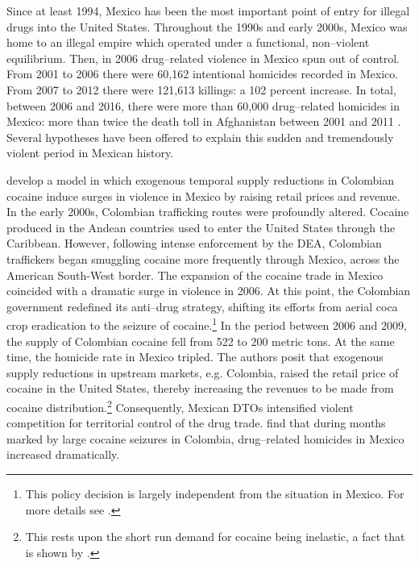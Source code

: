 \documentclass[12pt,letter,english,intoc,bibliography=totoc,index=totoc,BCOR10mm,captions=tableheading,nottitlepage,fleqn]{article}
\theoremstyle{break}
\begin{document}
Since at least 1994, Mexico has been the most important point of entry for illegal drugs into the United States. Throughout the 1990s and early 2000s, Mexico was home to an illegal empire which operated under a functional, non--violent equilibrium. Then, in 2006 drug--related violence in Mexico spun out of control. From 2001 to 2006 there were 60,162 intentional homicides recorded in Mexico. From 2007 to 2012 there were 121,613 killings: a 102 percent increase. In total, between 2006 and 2016, there were more than 60,000 drug--related homicides in Mexico: more than twice the death toll in Afghanistan between 2001 and 2011 \citep{Castillo2020}. Several hypotheses have been offered to explain this sudden and tremendously violent period in Mexican history. 

\citet{Castillo2020} develop a model in which exogenous temporal supply reductions in Colombian cocaine induce surges in violence in Mexico by raising retail prices and revenue. In the early 2000s, Colombian trafficking routes were profoundly altered. Cocaine produced in the Andean countries used to enter the United States through the Caribbean. However, following intense enforcement by the DEA, Colombian traffickers began smuggling cocaine more frequently through Mexico, across the American South-West border. The expansion of the cocaine trade in Mexico coincided with a dramatic surge in violence in 2006. At this point, the Colombian government redefined its anti--drug strategy, shifting its efforts from aerial coca crop eradication to the seizure of cocaine.\footnote{This policy decision is largely independent from the situation in Mexico. For more details see \citet{Castillo2020}.} In the period between 2006 and 2009, the supply of Colombian cocaine fell from 522 to 200 metric tons. At the same time, the homicide rate in Mexico tripled. The authors posit that exogenous supply reductions in upstream markets, e.g. Colombia, raised the retail price of cocaine in the United States, thereby increasing the revenues to be made from cocaine distribution.\footnote{This rests upon the short run demand for cocaine being inelastic, a fact that is shown by \citet{becker2006}.} Consequently, Mexican DTOs intensified violent competition for territorial control of the drug trade. \citet{Castillo2020} find that during months marked by large cocaine seizures in Colombia, drug--related homicides in Mexico increased dramatically.
\end{document}
